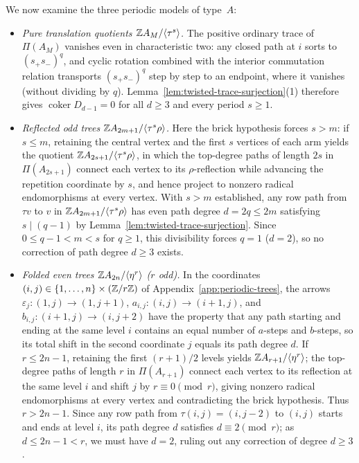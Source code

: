 We now examine the three periodic models of type~$A$:
\begin{itemize}
\item \emph{Pure translation quotients $\mathbb Z A_M/\langle\tau^s\rangle$.} The positive ordinary trace of $\Pi(A_M)$ vanishes even in characteristic two: any closed path at $i$ sorts to $(s_+s_-)^q$, and cyclic rotation combined with the interior commutation relation transports $(s_+s_-)^q$ step by step to an endpoint, where it vanishes (without dividing by $q$). Lemma~\ref{lem:twisted-trace-surjection}(1) therefore gives $\operatorname{coker}D_{d-1}=0$ for all $d\geq3$ and every period $s\geq1$.

\item \emph{Reflected odd trees $\mathbb Z A_{2m+1}/\langle\tau^s\rho\rangle$.} Here the brick hypothesis forces $s>m$: if $s\leq m$, retaining the central vertex and the first $s$ vertices of each arm yields the quotient $\mathbb Z A_{2s+1}/\langle\tau^s\rho\rangle$, in which the top-degree paths of length $2s$ in $\Pi(A_{2s+1})$ connect each vertex to its $\rho$-reflection while advancing the repetition coordinate by $s$, and hence project to nonzero radical endomorphisms at every vertex. With $s>m$ established, any row path from $\tau v$ to $v$ in $\mathbb Z A_{2m+1}/\langle\tau^s\rho\rangle$ has even path degree $d=2q\leq2m$ satisfying $s\mid(q-1)$ by Lemma~\ref{lem:twisted-trace-surjection}. Since $0\leq q-1<m<s$ for $q\geq1$, this divisibility forces $q=1$ ($d=2$), so no correction of path degree $d\geq3$ exists.

\item \emph{Folded even trees $\mathbb Z A_{2n}/\langle\eta^r\rangle$ ($r$ odd).} In the coordinates $(i,j)\in\{1,\ldots,n\}\times(\mathbb Z/r\mathbb Z)$ of Appendix~\ref{app:periodic-trees}, the arrows $\varepsilon_j\colon(1,j)\to(1,j+1)$, $a_{i,j}\colon(i,j)\to(i+1,j)$, and $b_{i,j}\colon(i+1,j)\to(i,j+2)$ have the property that any path starting and ending at the same level $i$ contains an equal number of $a$-steps and $b$-steps, so its total shift in the second coordinate $j$ equals its path degree $d$. If $r\leq2n-1$, retaining the first $(r+1)/2$ levels yields $\mathbb Z A_{r+1}/\langle\eta^r\rangle$; the top-degree paths of length $r$ in $\Pi(A_{r+1})$ connect each vertex to its reflection at the same level $i$ and shift $j$ by $r\equiv0\pmod r$, giving nonzero radical endomorphisms at every vertex and contradicting the brick hypothesis. Thus $r>2n-1$. Since any row path from $\tau(i,j)=(i,j-2)$ to $(i,j)$ starts and ends at level $i$, its path degree $d$ satisfies $d\equiv2\pmod r$; as $d\leq2n-1<r$, we must have $d=2$, ruling out any correction of degree $d\geq3$.
\end{itemize}

